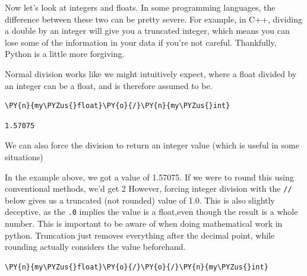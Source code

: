 Now let's look at integers and floats. In some programming languages,
the difference between these two can be pretty severe. For example, in
C++, dividing a double by an integer will give you a truncated integer,
which means you can lose some of the information in your data if you're
not careful. Thankfully, Python is a little more forgiving.

Normal division works like we might intuitively expect, where a float
divided by an integer can be a float, and is therefore assumed to be.

    \begin{tcolorbox}[breakable, size=fbox, boxrule=1pt, pad at break*=1mm,colback=cellbackground, colframe=cellborder]
\begin{Verbatim}[commandchars=\\\{\}]
\PY{n}{my\PYZus{}float}\PY{o}{/}\PY{n}{my\PYZus{}int}
\end{Verbatim}
\end{tcolorbox}

            \begin{tcolorbox}[breakable, size=fbox, boxrule=.5pt, pad at break*=1mm, opacityfill=0]
\begin{Verbatim}[commandchars=\\\{\}]
1.57075
\end{Verbatim}
\end{tcolorbox}
        
    We can also force the division to return an integer value (which is
useful in some situations)

In the example above, we got a value of 1.57075. If we were to round
this using conventional methods, we'd get 2 However, forcing integer
division with the \texttt{//} below gives us a truncated (not rounded)
value of 1.0. This is also slightly deceptive, as the \texttt{.0}
implies the value is a float,even though the result is a whole number.
This is important to be aware of when doing mathematical work in python.
Truncation just removes everything after the decimal point, while
rounding actually considers the value beforehand.

    \begin{tcolorbox}[breakable, size=fbox, boxrule=1pt, pad at break*=1mm,colback=cellbackground, colframe=cellborder]
\begin{Verbatim}[commandchars=\\\{\}]
\PY{n}{my\PYZus{}float}\PY{o}{/}\PY{o}{/}\PY{n}{my\PYZus{}int}
\end{Verbatim}
\end{tcolorbox}


